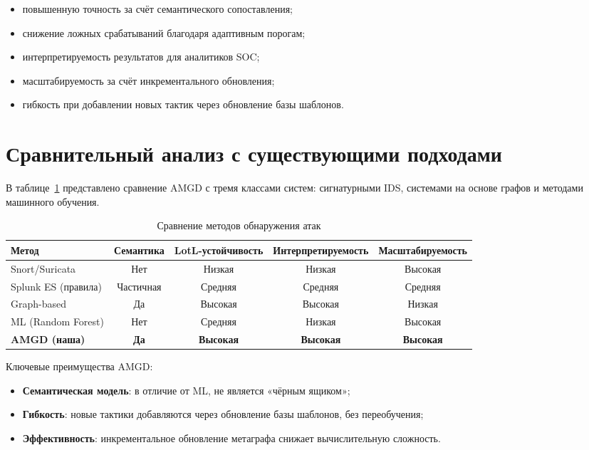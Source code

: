 \documentclass{article}
\begin{document}
\noindent
\begin{itemize}
    \item повышенную точность за счёт семантического сопоставления;
    \item снижение ложных срабатываний благодаря адаптивным порогам;
    \item интерпретируемость результатов для аналитиков SOC;
    \item масштабируемость за счёт инкрементального обновления;
    \item гибкость при добавлении новых тактик через обновление базы шаблонов.
\end{itemize}

\section{Сравнительный анализ с существующими подходами}\label{sec:ch3/comparison}

В таблице~\ref{tab:comparison} представлено сравнение AMGD с тремя классами систем: сигнатурными IDS, системами на основе графов и методами машинного обучения.

\begin{table}[ht]
\centering
\caption{Сравнение методов обнаружения атак}
\label{tab:comparison}
\begin{tabular}{lcccc}
\toprule
Метод & Семантика & LotL-устойчивость & Интерпретируемость & Масштабируемость \\
\midrule
Snort/Suricata & Нет & Низкая & Низкая & Высокая \\
Splunk ES (правила) & Частичная & Средняя & Средняя & Средняя \\
Graph-based~\cite{Gorbachev2018} & Да & Высокая & Высокая & Низкая \\
ML (Random Forest) & Нет & Средняя & Низкая & Высокая \\
\textbf{AMGD (наша)} & \textbf{Да} & \textbf{Высокая} & \textbf{Высокая} & \textbf{Высокая} \\
\bottomrule
\end{tabular}
\end{table}

Ключевые преимущества AMGD:
\begin{itemize}
    \item \textbf{Семантическая модель}: в отличие от ML, не является «чёрным ящиком»;
    \item \textbf{Гибкость}: новые тактики добавляются через обновление базы шаблонов, без переобучения;
    \item \textbf{Эффективность}: инкрементальное обновление метаграфа снижает вычислительную сложность.
\end{itemize}
\end{document}
